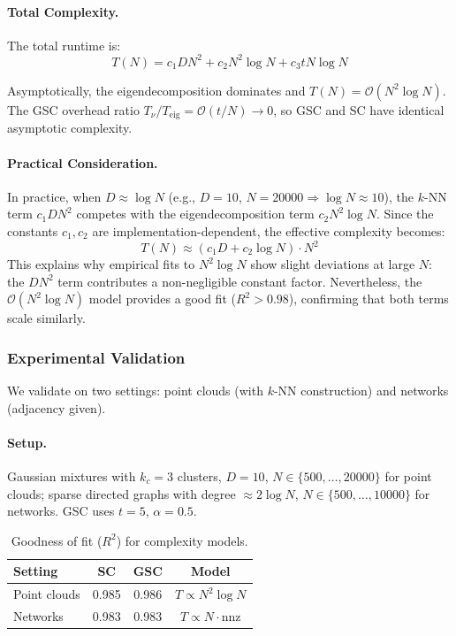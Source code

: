 \paragraph{Total Complexity.}
The total runtime is:
\begin{equation}
    T(N) = c_1 DN^2 + c_2 N^2 \log N + c_3 tN \log N
\end{equation}

Asymptotically, the eigendecomposition dominates and $T(N) = \mathcal{O}(N^2 \log N)$. The GSC overhead ratio $T_\nu / T_{\text{eig}} = \mathcal{O}(t/N) \to 0$, so GSC and SC have identical asymptotic complexity.

\paragraph{Practical Consideration.}
In practice, when $D \approx \log N$ (e.g., $D = 10$, $N = 20000 \Rightarrow \log N \approx 10$), the $k$-NN term $c_1 DN^2$ competes with the eigendecomposition term $c_2 N^2 \log N$. Since the constants $c_1, c_2$ are implementation-dependent, the effective complexity becomes:
\begin{equation}
    T(N) \approx (c_1 D + c_2 \log N) \cdot N^2
\end{equation}
This explains why empirical fits to $N^2 \log N$ show slight deviations at large $N$: the $DN^2$ term contributes a non-negligible constant factor. Nevertheless, the $\mathcal{O}(N^2 \log N)$ model provides a good fit ($R^2 > 0.98$), confirming that both terms scale similarly.

\subsubsection{Experimental Validation}

We validate on two settings: point clouds (with $k$-NN construction) and networks (adjacency given).

\paragraph{Setup.}
Gaussian mixtures with $k_c = 3$ clusters, $D = 10$, $N \in \{500, \ldots, 20000\}$ for point clouds; sparse directed graphs with degree $\approx 2\log N$, $N \in \{500, \ldots, 10000\}$ for networks. GSC uses $t = 5$, $\alpha = 0.5$.

\begin{table}[h]
\centering
\caption{Goodness of fit ($R^2$) for complexity models.}
\label{tab:complexity_validation}
\begin{tabular}{l|cc|c}
\toprule
Setting & SC & GSC & Model \\
\midrule
Point clouds & 0.985 & 0.986 & $T \propto N^2 \log N$ \\
Networks & 0.983 & 0.983 & $T \propto N \cdot \mathrm{nnz}$ \\
\bottomrule
\end{tabular}
\end{table}


